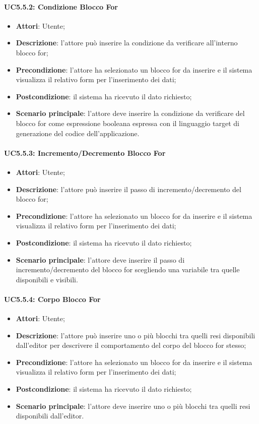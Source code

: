 \paragraph{UC5.5.2: Condizione Blocco For}
\label{UC5.5.2}
\begin{itemize}
\item \textbf{Attori}: Utente;
\item \textbf{Descrizione}: l'attore può inserire la condizione da verificare all'interno blocco for;	
\item \textbf{Precondizione}:  l'attore ha selezionato un blocco for da inserire e il sistema visualizza il relativo form per l'inserimento dei dati;	
\item \textbf{Postcondizione}: il sistema ha ricevuto il dato richiesto;	
\item \textbf{Scenario principale}:
l'attore deve inserire la condizione da verificare del blocco for come espressione booleana espressa con il linguaggio target di generazione del codice dell'applicazione.	
\end{itemize}

\paragraph{UC5.5.3: Incremento/Decremento Blocco For}
\label{UC5.5.3}
\begin{itemize}
\item \textbf{Attori}: Utente;
\item \textbf{Descrizione}: l'attore può inserire il passo di incremento/decremento del blocco for;	
\item \textbf{Precondizione}: l'attore ha selezionato un blocco for da inserire e il sistema visualizza il relativo form per l'inserimento dei dati;	
\item \textbf{Postcondizione}: il sistema ha ricevuto il dato richiesto;	
\item \textbf{Scenario principale}:
l'attore deve inserire il passo di incremento/decremento del blocco for scegliendo una variabile tra quelle disponibili e visibili.	
\end{itemize}

\paragraph{UC5.5.4: Corpo Blocco For}
\label{UC5.5.4}
\begin{itemize}
\item \textbf{Attori}: Utente;
\item \textbf{Descrizione}: l'attore può inserire uno o più blocchi tra quelli resi disponibili dall'editor per descrivere il comportamento del corpo del blocco for stesso;	
\item \textbf{Precondizione}: l'attore ha selezionato un blocco for da inserire e il sistema visualizza il relativo form per l'inserimento dei dati;	
\item \textbf{Postcondizione}: il sistema ha ricevuto il dato richiesto;	
\item \textbf{Scenario principale}:
l'attore deve inserire uno o più blocchi tra quelli resi disponibili dall'editor.	
\end{itemize}

